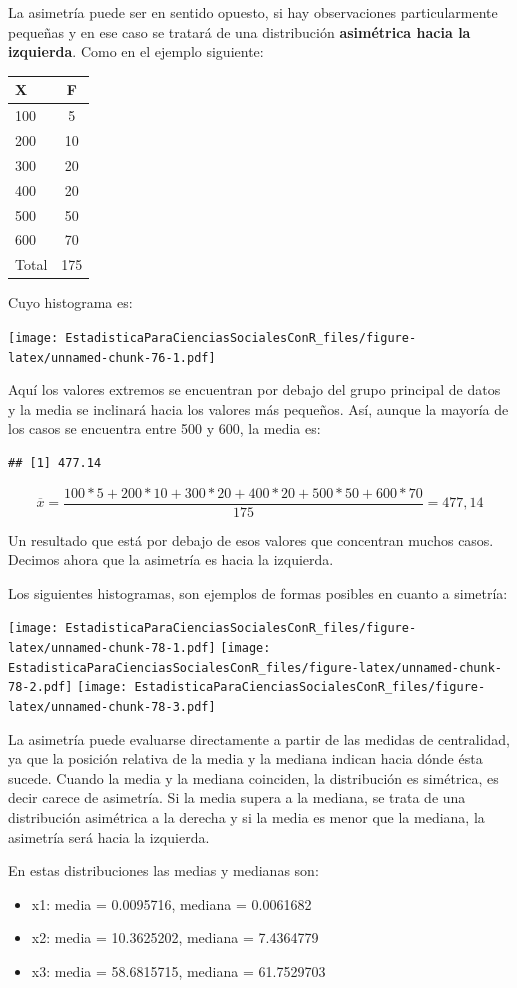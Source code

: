 \documentclass[]{book}
\providecommand{\tightlist}{%
  \setlength{\itemsep}{0pt}\setlength{\parskip}{0pt}}
\begin{document}
La asimetría puede ser en sentido opuesto, si hay observaciones
particularmente pequeñas y en ese caso se tratará de una distribución
\textbf{asimétrica hacia la izquierda}. Como en el ejemplo siguiente:

\begin{longtable}[]{@{}lc@{}}
\toprule
X & F\tabularnewline
\midrule
\endhead
100 & 5\tabularnewline
200 & 10\tabularnewline
300 & 20\tabularnewline
400 & 20\tabularnewline
500 & 50\tabularnewline
600 & 70\tabularnewline
Total & 175\tabularnewline
\bottomrule
\end{longtable}

Cuyo histograma es:

\texttt{[image: EstadisticaParaCienciasSocialesConR\_files/figure-latex/unnamed-chunk-76-1.pdf]}

Aquí los valores extremos se encuentran por debajo del grupo principal
de datos y la media se inclinará hacia los valores más pequeños. Así,
aunque la mayoría de los casos se encuentra entre 500 y 600, la media
es:

\begin{verbatim}
## [1] 477.14
\end{verbatim}

\[\overline{x} = \frac{100*5 + 200*10 + 300*20 + 400*20 + 500*50 + 600*70}{175} = 477,14\]

Un resultado que está por debajo de esos valores que concentran muchos
casos. Decimos ahora que la asimetría es hacia la izquierda.

Los siguientes histogramas, son ejemplos de formas posibles en cuanto a simetría:

\texttt{[image: EstadisticaParaCienciasSocialesConR\_files/figure-latex/unnamed-chunk-78-1.pdf]} \texttt{[image: EstadisticaParaCienciasSocialesConR\_files/figure-latex/unnamed-chunk-78-2.pdf]} \texttt{[image: EstadisticaParaCienciasSocialesConR\_files/figure-latex/unnamed-chunk-78-3.pdf]}

La asimetría puede evaluarse directamente a partir de las medidas de
centralidad, ya que la posición relativa de la media y la mediana
indican hacia dónde ésta sucede. Cuando la media y la mediana coinciden,
la distribución es simétrica, es decir carece de asimetría. Si la media
supera a la mediana, se trata de una distribución asimétrica a la
derecha y si la media es menor que la mediana, la asimetría será hacia
la izquierda.

En estas distribuciones las medias y medianas son:

\begin{itemize}
\tightlist
\item
  x1: media = 0.0095716, mediana = 0.0061682
\item
  x2: media = 10.3625202, mediana = 7.4364779
\item
  x3: media = 58.6815715, mediana = 61.7529703
\end{itemize}
\end{document}
